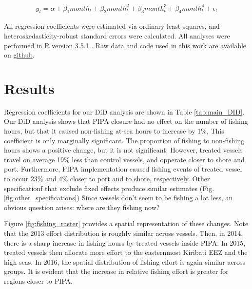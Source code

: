 \documentclass[9p,twocolumn,twoside,lineno]{pnas-new}
\begin{document}
\begin{figure}[h]
\begin{align*}
y_t = \alpha + \beta_1 month_t + \beta_2 month_t^2 + \beta_3 month_t^3 + \beta_4 month_t ^4 + \epsilon_t
\end{align*}
\end{figure}

All regression coefficients were estimated via ordinary least squares,
and heteroskedasticity-robust standard errors were calculated. All analyses
were performed in R version 3.5.1 \citep{rcore_2018}. Raw data and code
used in this work are available on
\href{https://github.com/jcvdav/MPA_displacement}{github}.

\section{Results}\label{results}

Regression coefficients for our DiD analysis are shown in Table
\ref{tab:main_DID}. Our DiD analysis shows that PIPA closure
had no effect on the number of fishing hours, but that it caused
non-fishing at-sea hours to increase by 1\%, This coefficient is
only marginally significant. The proportion of
fishing to non-fishing hours shows a positive change, but it is not
significant. However, treated vessels travel on average 19\% less
than control vessels, and opperate closer to shore and port.
Furthermore, PIPA implementation caused fishing events of treated
vessel to occur 23\% and 4\% closer to port and to shore, respectively.
Other specificationf that exclude fixed effects produce similar estimates (Fig. \ref{fig:other_specifications})
Since vessels don't seem to be fishing a lot less, an obvious question arises: where are they
fishing now?


Figure \ref{fig:fishing_raster} provides a spatial representation of
these changes. Note that the 2013 effort distribution is roughly similar
across vessels. Then, in 2014, there is a sharp increase in fishing hours
by treated vessels inside PIPA. In 2015, treated vessels
then allocate more effort to the easternmost Kiribati EEZ and the high seas.
In 2016, the spatial distribution of
fishing effort is again similar across groups. It is evident that the
increase in relative fishing effort is greater for regions closer to
PIPA. 
\end{document}
